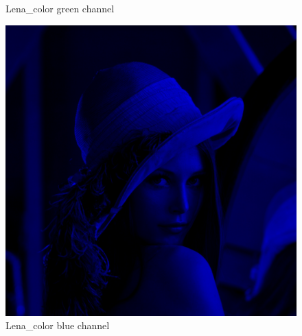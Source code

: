 \begin{figure}[h]
\begin{minipage}{0.45\textwidth}
		\caption{Lena\_color green channel}
		\label{fig:1b}
        \end{minipage}
        \hspace{0.05\textwidth}
        \begin{minipage}{0.45\textwidth}
        		\centering
		\includegraphics[width=\linewidth]{images/source/task4/1/3}
		\caption{Lena\_color blue channel}
		\label{fig:1b}
        \end{minipage}
\end{figure}

